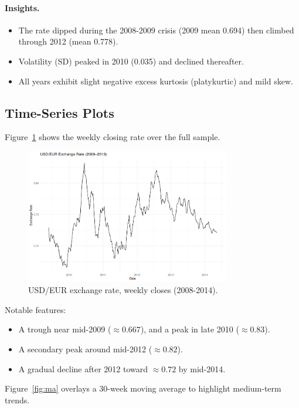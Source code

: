 \documentclass[11pt,a4paper]{article}
\begin{document}
    \paragraph{Insights.}
    \begin{itemize}
    \item The rate dipped during the 2008-2009 crisis (2009 mean 0.694) then climbed through 2012 (mean 0.778).
    \item Volatility (SD) peaked in 2010 (0.035) and declined thereafter.
    \item All years exhibit slight negative excess kurtosis (platykurtic) and mild skew.
    \end{itemize}

    \subsection{Time-Series Plots}
    Figure~\ref{fig:ts} shows the weekly closing rate over the full sample.

    \begin{figure}[H]
    \centering
    \includegraphics[width=0.8\textwidth]{figures/usdeur_timeseries.png}
    \caption{USD/EUR exchange rate, weekly closes (2008-2014).}
    \label{fig:ts}
    \end{figure}

    Notable features:
    \begin{itemize}
    \item A trough near mid-2009 (\(\approx0.667\)), and a peak in late 2010 (\(\approx0.83\)).
    \item A secondary peak around mid-2012 (\(\approx0.82\)).
    \item A gradual decline after 2012 toward \(\approx0.72\) by mid-2014.
    \end{itemize}

    Figure~\ref{fig:ma} overlays a 30-week moving average to highlight medium-term trends.
\end{document}
